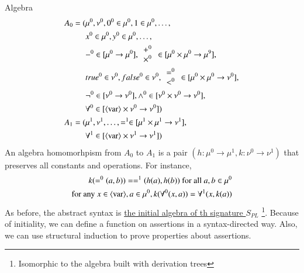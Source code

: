 \documentclass{report}[12pt]
\begin{document}
Algebra
\begin{align*}
    A_0 = (&\mu^0, \nu^0, 0^0 \in \mu^0, 1 \in \mu^0, \ldots,  \\
    &x^0 \in \mu^0, y^0 \in \mu^0, \ldots, \\
    &-^0\in [\mu^0 \rightarrow \mu^0], \begin{array}{c}+^0 \\ \times^0 \end{array} \in [\mu^0 \times \mu^0 \rightarrow \mu^9], \\
    &true^0 \in \nu^0, false^0 \in \nu^0, \begin{array}{c} =^0 \\ <^0 \end{array} \in [\mu^0 \times \mu^0 \rightarrow \nu^0], \\
    &\neg^0 \in [\nu^0 \rightarrow \nu^0], \wedge^0 \in [\nu^0 \times \nu^0 \rightarrow \nu^0], \\
    &\forall^0 \in [\langle \text{var}\rangle \times \nu^0 \rightarrow \nu^0]) \\
    A_1 = (&\mu^1, \nu^1, \ldots, =^1 \in [\mu^1 \times \mu^1 \rightarrow \nu^1], \\
    &\forall^1\in [\langle \text{var}\rangle \times \nu^1 \rightarrow \nu^1])
\end{align*}
An algebra homomorhpism from $A_0$ to $A_1$ is a pair $(h:\mu^0\rightarrow \mu^1, k:\nu^0\rightarrow\nu^1)$ that preserves all constants and operations. For instance,
\begin{align*}
    k(=^0 (a, b)) = =^1 (h(a), h(b)) \text{ for all }a, b\in \mu^0 \\
    \text{for any }x\in \langle \text{var}\rangle, a\in \mu^0, k(\forall^0 (x, a)) = \forall^1 (x, k(a))
\end{align*}
As before, the abstract syntax is \underline{the initial algebra of th signature $S_{PL}$} \footnote{Isomorphic to the algebra built with derivation trees}. Because of initiality, we can define a function on assertions in a syntax-directed way. Also, we can use structural induction to prove properties about assertions. \\
\end{document}
